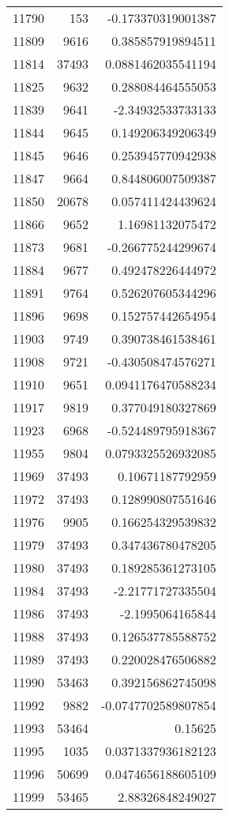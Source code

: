 \begin{tabular}{r | r | r}
11790 & 153 & -0.173370319001387 \\
11809 & 9616 & 0.385857919894511 \\
11814 & 37493 & 0.0881462035541194 \\
11825 & 9632 & 0.288084464555053 \\
11839 & 9641 & -2.34932533733133 \\
11844 & 9645 & 0.149206349206349 \\
11845 & 9646 & 0.253945770942938 \\
11847 & 9664 & 0.844806007509387 \\
11850 & 20678 & 0.057411424439624 \\
11866 & 9652 & 1.16981132075472 \\
11873 & 9681 & -0.266775244299674 \\
11884 & 9677 & 0.492478226444972 \\
11891 & 9764 & 0.526207605344296 \\
11896 & 9698 & 0.152757442654954 \\
11903 & 9749 & 0.390738461538461 \\
11908 & 9721 & -0.430508474576271 \\
11910 & 9651 & 0.0941176470588234 \\
11917 & 9819 & 0.377049180327869 \\
11923 & 6968 & -0.524489795918367 \\
11955 & 9804 & 0.0793325526932085 \\
11969 & 37493 & 0.10671187792959 \\
11972 & 37493 & 0.128990807551646 \\
11976 & 9905 & 0.166254329539832 \\
11979 & 37493 & 0.347436780478205 \\
11980 & 37493 & 0.189285361273105 \\
11984 & 37493 & -2.21771727335504 \\
11986 & 37493 & -2.1995064165844 \\
11988 & 37493 & 0.126537785588752 \\
11989 & 37493 & 0.220028476506882 \\
11990 & 53463 & 0.392156862745098 \\
11992 & 9882 & -0.0747702589807854 \\
11993 & 53464 & 0.15625 \\
11995 & 1035 & 0.0371337936182123 \\
11996 & 50699 & 0.0474656188605109 \\
11999 & 53465 & 2.88326848249027 \\

\end{tabular}
